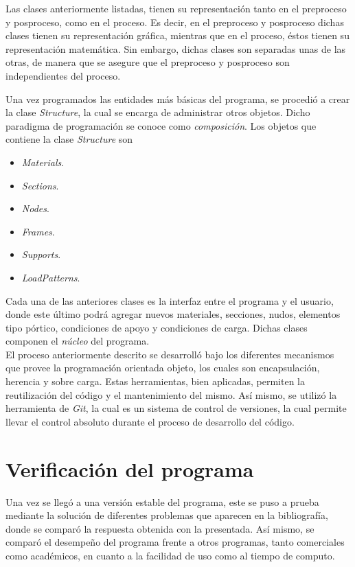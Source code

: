 Las clases anteriormente listadas, tienen su representación tanto en el preproceso y posproceso, como en el proceso. Es decir, en el preproceso y posproceso dichas clases tienen su representación gráfica, mientras que en el proceso, éstos tienen su representación matemática. Sin embargo, dichas clases son separadas unas de las otras, de manera que se asegure que el preproceso y posproceso son independientes del proceso.

Una vez programados las entidades más básicas del programa, se procedió a crear la clase \textit{Structure}, la cual se encarga de administrar otros objetos. Dicho paradigma de programación se conoce como \textit{composición}. Los objetos que contiene la clase \textit{Structure} son

\begin{itemize}
    \item \textit{Materials}.
    \item \textit{Sections}.
    \item \textit{Nodes}.
    \item \textit{Frames}.
    \item \textit{Supports}.
    \item \textit{LoadPatterns}.
\end{itemize}

Cada una de las anteriores clases es la interfaz entre el programa y el usuario, donde este último podrá agregar nuevos materiales, secciones, nudos, elementos tipo pórtico, condiciones de apoyo y condiciones de carga. Dichas clases componen el \textit{núcleo} del programa.\\

El proceso anteriormente descrito se desarrolló bajo los diferentes mecanismos que provee la programación orientada objeto, los cuales son encapsulación, herencia y sobre carga. Estas herramientas, bien aplicadas, permiten la reutilización del código y el mantenimiento del mismo. Así mismo, se utilizó la herramienta de \textit{Git}, la cual es un sistema de control de versiones, la cual permite llevar el control absoluto durante el proceso de desarrollo del código.\\

\section{Verificación del programa}

Una vez se llegó a una versión estable del programa, este se puso a prueba mediante la solución de diferentes problemas que aparecen en la bibliografía, donde se comparó la respuesta obtenida con la presentada. Así mismo, se comparó el desempeño del programa frente a otros programas, tanto comerciales como académicos, en cuanto a la facilidad de uso como al tiempo de computo. \\